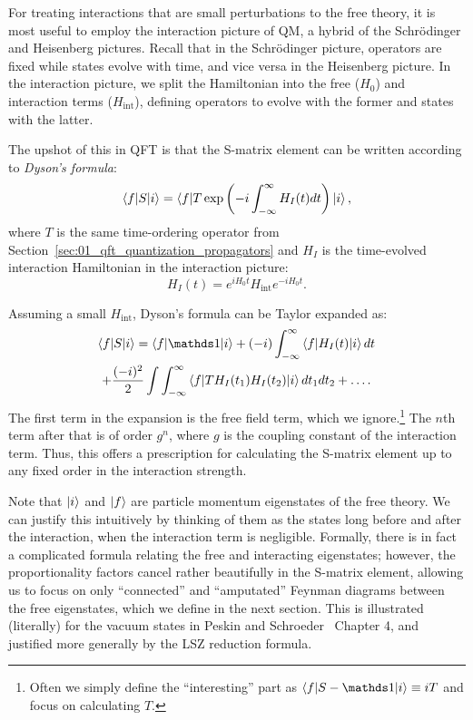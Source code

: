 For treating interactions that are small perturbations to the free theory, it is most useful to employ the interaction picture of QM, a hybrid of the Schr\"odinger and Heisenberg pictures.
Recall that in the Schr\"odinger picture, operators are fixed while states evolve with time, and vice versa in the Heisenberg picture.
In the interaction picture, we split the Hamiltonian into the free ($H_0$) and interaction terms ($H_{\mathrm{int}}$), defining operators to evolve with the former and states with the latter.

The upshot of this in QFT is that the S-matrix element can be written according to \textit{Dyson's formula}:
\begin{equation}
	\label{eq:01_qft_interactions_dysons_formula}
	\braket{f|S|i} = \braket{f|T\exp\left(-i\int_{-\infty}^\infty H_I(t)dt\right)|i},
\end{equation}
where $T$ is the same time-ordering operator from Section~\ref{sec:01_qft_quantization_propagators} and $H_I$ is the time-evolved interaction Hamiltonian in the interaction picture:
\begin{equation}
	\label{eq:01_qft_interactions_interaction_hamiltonian}
	H_I(t) = e^{iH_0t}H_{\mathrm{int}}e^{-iH_0t}.
\end{equation}

Assuming a small $H_{\mathrm{int}}$, Dyson's formula can be Taylor expanded as:
\begin{multline}
	\label{eq:01_qft_interactions_dysons_expansion}
	\braket{f|S|i} = \braket{f|\identity|i} + (-i) \int_{-\infty}^\infty \braket{f|H_I(t)|i}dt \\
	+ \frac{(-i)^2}{2} \int\int_{-\infty}^{\infty} \braket{f|T H_I(t_1)H_I(t_2)|i}dt_1dt_2 + \ldots.
\end{multline}
The first term in the expansion is the free field term, which we ignore.\footnote{Often we simply define the ``interesting'' part as $\braket{f|S-\identity|i} \equiv iT$ and focus on calculating $T$.}
The $n$th term after that is of order $g^n$, where $g$ is the coupling constant of the interaction term.
Thus, this offers a prescription for calculating the S-matrix element up to any fixed order in the interaction strength.

Note that $\ket{i}$ and $\ket{f}$ are particle momentum eigenstates of the free theory. 
We can justify this intuitively by thinking of them as the states long before and after the interaction, when the interaction term is negligible.
Formally, there is in fact a complicated formula relating the free and interacting eigenstates; however, the proportionality factors cancel rather beautifully in the S-matrix element, allowing us to focus on only ``connected'' and ``amputated'' Feynman diagrams between the free eigenstates, which we define in the next section.
This is illustrated (literally) for the vacuum states in Peskin and Schroeder~\cite{Peskin:1995ev} Chapter 4, and justified more generally by the LSZ reduction formula.


